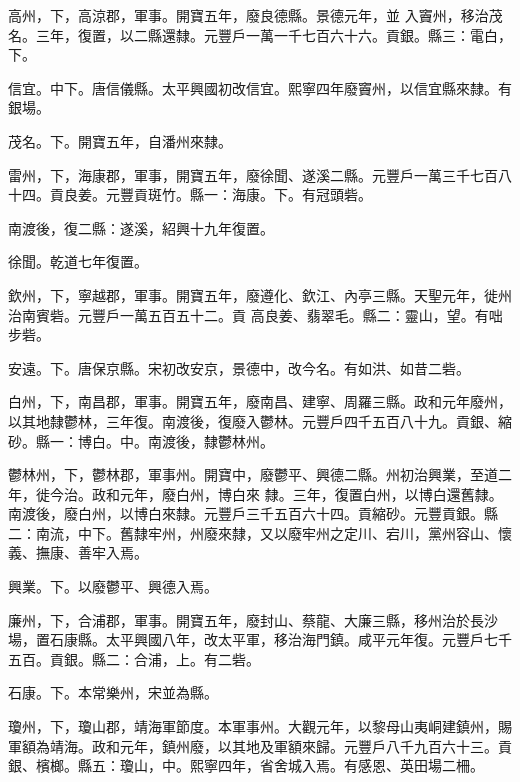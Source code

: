 \begin{pinyinscope}
 高州，下，高涼郡，軍事。開寶五年，廢良德縣。景德元年，並
 入竇州，移治茂名。三年，復置，以二縣還隸。元豐戶一萬一千七百六十六。貢銀。縣三：電白，下。



 信宜。中下。唐信儀縣。太平興國初改信宜。熙寧四年廢竇州，以信宜縣來隸。有銀場。



 茂名。下。開寶五年，自潘州來隸。



 雷州，下，海康郡，軍事，開寶五年，廢徐聞、遂溪二縣。元豐戶一萬三千七百八十四。貢良姜。元豐貢斑竹。縣一：海康。下。有冠頭砦。



 南渡後，復二縣：遂溪，紹興十九年復置。



 徐聞。乾道七年復置。



 欽州，下，寧越郡，軍事。開寶五年，廢遵化、欽江、內亭三縣。天聖元年，徙州治南賓砦。元豐戶一萬五百五十二。貢
 高良姜、翡翠毛。縣二：靈山，望。有咄步砦。



 安遠。下。唐保京縣。宋初改安京，景德中，改今名。有如洪、如昔二砦。



 白州，下，南昌郡，軍事。開寶五年，廢南昌、建寧、周羅三縣。政和元年廢州，以其地隸鬱林，三年復。南渡後，復廢入鬱林。元豐戶四千五百八十九。貢銀、縮砂。縣一：博白。中。南渡後，隸鬱林州。



 鬱林州，下，鬱林郡，軍事州。開寶中，廢鬱平、興德二縣。州初治興業，至道二年，徙今治。政和元年，廢白州，博白來
 隸。三年，復置白州，以博白還舊隸。南渡後，廢白州，以博白來隸。元豐戶三千五百六十四。貢縮砂。元豐貢銀。縣二：南流，中下。舊隸牢州，州廢來隸，又以廢牢州之定川、宕川，黨州容山、懷義、撫康、善牢入焉。



 興業。下。以廢鬱平、興德入焉。



 廉州，下，合浦郡，軍事。開寶五年，廢封山、蔡龍、大廉三縣，移州治於長沙場，置石康縣。太平興國八年，改太平軍，移治海門鎮。咸平元年復。元豐戶七千五百。貢銀。縣二：合浦，上。有二砦。



 石康。下。本常樂州，宋並為縣。



 瓊州，下，瓊山郡，靖海軍節度。本軍事州。大觀元年，以黎母山夷峒建鎮州，賜軍額為靖海。政和元年，鎮州廢，以其地及軍額來歸。元豐戶八千九百六十三。貢銀、檳榔。縣五：瓊山，中。熙寧四年，省舍城入焉。有感恩、英田場二柵。




\end{pinyinscope}
